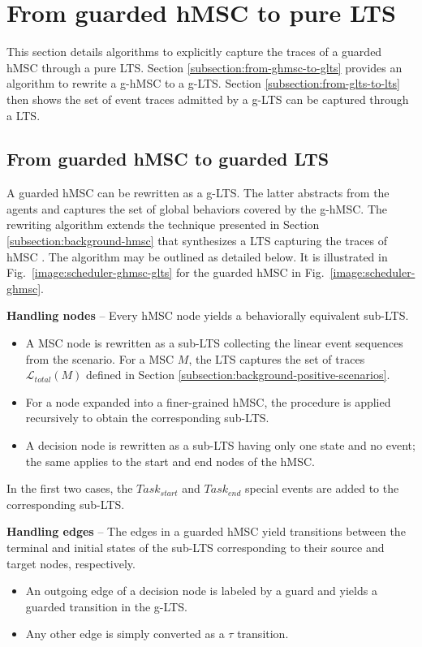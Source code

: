 \section{From guarded hMSC to pure LTS\label{section:deductive-glts-to-lts}}

This section details algorithms to explicitly capture the traces of a guarded hMSC through a pure LTS. Section \ref{subsection:from-ghmsc-to-glts} provides an algorithm to rewrite a g-hMSC to a g-LTS. Section \ref{subsection:from-glts-to-lts} then shows the set of event traces admitted by a g-LTS can be captured through a LTS.

\subsection{From guarded hMSC to guarded LTS\label{subsection:from-ghmsc-to-glts}}

A guarded hMSC can be rewritten as a g-LTS. The latter abstracts from the agents and captures the set of global behaviors covered by the g-hMSC. The rewriting algorithm extends the technique presented in Section \ref{subsection:background-hmsc} that synthesizes a LTS capturing the traces of hMSC \cite{Uchitel:2004}. The algorithm may
be outlined as detailed below. It is illustrated in Fig.~\ref{image:scheduler-ghmsc-glts} for the guarded hMSC in Fig.~\ref{image:scheduler-ghmsc}.

\noindent \textbf{Handling nodes} -- Every hMSC node yields a behaviorally equivalent sub-LTS.
\begin{itemize}
\item A MSC node is rewritten as a sub-LTS collecting the linear event sequences from the scenario. For a MSC $M$, the LTS captures the set of traces $\mathcal{L}_{total}(M)$ defined in Section \ref{subsection:background-positive-scenarios}.
\item For a node expanded into a finer-grained hMSC, the procedure is applied recursively to obtain the corresponding sub-LTS.
\item A decision node is rewritten as a sub-LTS having only one state and no event; the same applies to the start and end nodes of the hMSC.
\end{itemize}
In the first two cases, the $Task_{start}$ and $Task_{end}$ special events are added to the corresponding sub-LTS.

\noindent \textbf{Handling edges} -- The edges in a guarded hMSC yield transitions between the terminal and initial states of the sub-LTS corresponding to their source and target nodes, respectively.
\begin{itemize}
\item An outgoing edge of a decision node is labeled by a guard and yields a guarded transition in the g-LTS.
\item Any other edge is simply converted as a $\tau$ transition.
\end{itemize}

